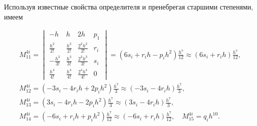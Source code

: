 Используя известные свойства определителя \cite{mc:bib15} и пренебрегая старшими степенями, имеем

\begin{gather}

\label{mvc:eq43}

M_{11}^{4i}=

\begin{vmatrix}

      -h & h & 2h & p_1

   \\

      \frac{h^2}{2!} &   \frac{h^2}{2!} &     \frac{2^2h^2}{2!} & r_i

   \\

      -\frac{h^3}{3!} &   \frac{h^3}{3!} &   \frac{2^3h^3}{3!} & s_i

    \\

      \frac{h^4}{4!} &   \frac{h^4}{4!} &   \frac{2^4h^4}{4!} & 0

 \end{vmatrix}


   = (6s_i + r_ih - p_ih^2 )\frac{h^7}{12}\approx  (6s_i + r_ih)\frac{h^7}{12},



\\

\label{mvc:eq46}  

M_{12}^{4i}=

(-3s_i - 4r_ih + 2p_ih^2 )\frac{h^7}{3}\approx  (- 3s_i - 4r_ih)\frac{h^7}{3},



\\

\label{mvc:eq46}  

M_{13}^{4i}=

(3s_i - 4r_ih - 2p_ih^2 )\frac{h^7}{3}\approx  (3s_i - 4r_ih )\frac{h^7}{3},



\\

\label{mvc:eq46}

M_{14}^{4i}=

(- 6s_i + r_ih + p_ih^2 )\frac{h^7}{12}\approx  (- 6s_i + r_ih )\frac{h^7}{12},\quad 

  M_{15}^{4i}=q_ih^{10}.

\end{gather}



